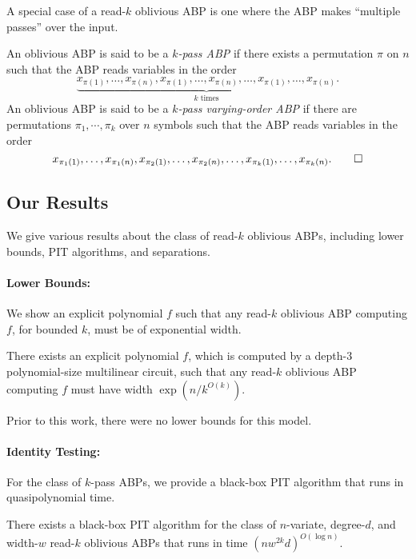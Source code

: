 \documentclass[11pt]{article}
\begin{document}
A special case of a read-$k$ oblivious ABP is one where the ABP makes ``multiple passes'' over the input.

\begin{definition}
\label{defn:k-pass-abp}
An oblivious ABP is said to be a \emph{$k$-pass ABP} if there exists a permutation $\pi$ on $n$ such that the ABP reads variables in the order
\[
\underbrace{x_{\pi(1)}, \ldots, x_{\pi(n)}, x_{\pi(1)}, \ldots, x_{\pi(n)}, \ldots, x_{\pi(1)}, \ldots, x_{\pi(n)}}_{\text{$k$ times}}.
\]
An oblivious ABP is said to be a \emph{$k$-pass varying-order ABP} if there are permutations $\pi_1, \cdots, \pi_k$ over $n$ symbols such that the ABP reads variables in the order
\[
x_{\pi_1(1)}, \ldots, x_{\pi_1(n)}, x_{\pi_2(1)}, \ldots, x_{\pi_2(n)}, \ldots, x_{\pi_k(1)}, \ldots, x_{\pi_k(n)}.\qedhere
\]
\end{definition}

\subsection{Our Results}
\label{sec:results}

We give various results about the class of read-$k$ oblivious ABPs, including lower bounds, PIT algorithms, and separations.

\paragraph{Lower Bounds:} We show an explicit polynomial $f$ such that any read-$k$ oblivious ABP computing $f$, for bounded $k$, must be of exponential width.

\begin{theorem}
\label{thm:intro:lower-bound-k-abp}
There exists an explicit polynomial $f$, which is computed by a depth-3 polynomial-size multilinear circuit, such that any read-$k$ oblivious ABP computing $f$ must have width $\exp(n/k^{O(k)})$.
\end{theorem}

Prior to this work, there were no lower bounds for this model.

\paragraph{Identity Testing:} For the class of $k$-pass ABPs, we provide a black-box PIT algorithm that runs in quasipolynomial time.

\begin{theorem}
\label{thm:intro:pit-k-pass}
There exists a black-box PIT algorithm for the class of $n$-variate, degree-$d$, and width-$w$ read-$k$ oblivious ABPs that runs in time $(nw^{2k}d)^{O(\log n)}$.
\end{theorem}
\end{document}
